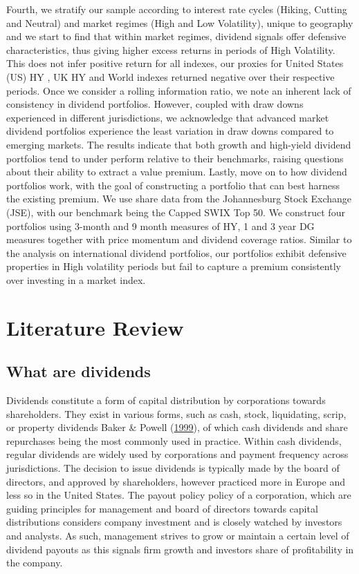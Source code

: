 \documentclass[10pt,preprint, authoryear]{elsarticle}
\numberwithin{equation}{section}
\numberwithin{figure}{section}
\numberwithin{table}{section}
\begin{document}
Fourth, we stratify our sample according to interest rate cycles
(Hiking, Cutting and Neutral) and market regimes (High and Low
Volatility), unique to geography and we start to find that within market
regimes, dividend signals offer defensive characteristics, thus giving
higher excess returns in periods of High Volatility. This does not infer
positive return for all indexes, our proxies for United States (US) HY ,
UK HY and World indexes returned negative over their respective periods.
Once we consider a rolling information ratio, we note an inherent lack
of consistency in dividend portfolios. However, coupled with draw downs
experienced in different jurisdictions, we acknowledge that advanced
market dividend portfolios experience the least variation in draw downs
compared to emerging markets. The results indicate that both growth and
high-yield dividend portfolios tend to under perform relative to their
benchmarks, raising questions about their ability to extract a value
premium. Lastly, move on to how dividend portfolios work, with the goal
of constructing a portfolio that can best harness the existing premium.
We use share data from the Johannesburg Stock Exchange (JSE), with our
benchmark being the Capped SWIX Top 50. We construct four portfolios
using 3-month and 9 month measures of HY, 1 and 3 year DG measures
together with price momentum and dividend coverage ratios. Similar to
the analysis on international dividend portfolios, our portfolios
exhibit defensive properties in High volatility periods but fail to
capture a premium consistently over investing in a market index.

\hypertarget{literature-review}{%
\section*{Literature Review}\label{literature-review}}

\hypertarget{what-are-dividends}{%
\subsection*{What are dividends}\label{what-are-dividends}}

Dividends constitute a form of capital distribution by corporations
towards shareholders. They exist in various forms, such as cash, stock,
liquidating, scrip, or property dividends Baker \& Powell
(\protect\hyperlink{ref-baker1999corporate}{1999}), of which cash
dividends and share repurchases being the most commonly used in
practice. Within cash dividends, regular dividends are widely used by
corporations and payment frequency across jurisdictions. The decision to
issue dividends is typically made by the board of directors, and
approved by shareholders, however practiced more in Europe and less so
in the United States. The payout policy policy of a corporation, which
are guiding principles for management and board of directors towards
capital distributions considers company investment and is closely
watched by investors and analysts. As such, management strives to grow
or maintain a certain level of dividend payouts as this signals firm
growth and investors share of profitability in the company.
\end{document}
